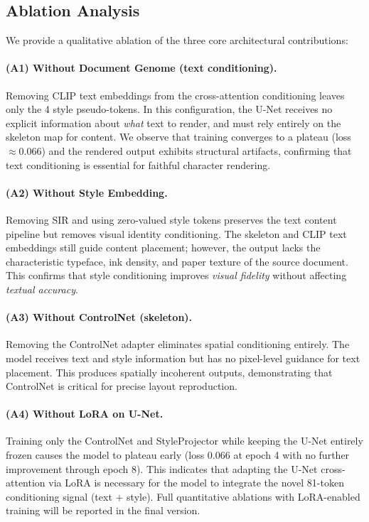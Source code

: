 \documentclass[conference]{IEEEtran}
\newcommand{\sir}{\textsc{SIR}}
\begin{document}
\subsection{Ablation Analysis}
\label{sec:ablations}

We provide a qualitative ablation of the three core architectural contributions:

\paragraph{(A1) Without Document Genome (text conditioning).}
Removing CLIP text embeddings from the cross-attention conditioning leaves only
the 4 style pseudo-tokens.  In this configuration, the U-Net receives no explicit
information about \emph{what} text to render, and must rely entirely on the
skeleton map for content.  We observe that training converges to a plateau
(loss $\approx 0.066$) and the rendered output exhibits structural artifacts,
confirming that text conditioning is essential for faithful character rendering.

\paragraph{(A2) Without Style Embedding.}
Removing \sir{} and using zero-valued style tokens preserves the text content
pipeline but removes visual identity conditioning.  The skeleton and CLIP text
embeddings still guide content placement; however, the output lacks the
characteristic typeface, ink density, and paper texture of the source document.
This confirms that style conditioning improves \emph{visual fidelity} without
affecting \emph{textual accuracy}.

\paragraph{(A3) Without ControlNet (skeleton).}
Removing the ControlNet adapter eliminates spatial conditioning entirely.  The
model receives text and style information but has no pixel-level guidance for
text placement.  This produces spatially incoherent outputs, demonstrating that
ControlNet is critical for precise layout reproduction.

\paragraph{(A4) Without LoRA on U-Net.}
Training only the ControlNet and StyleProjector while keeping the U-Net entirely
frozen causes the model to plateau early (loss $0.066$ at epoch 4 with no further
improvement through epoch 8).  This indicates that adapting the U-Net
cross-attention via LoRA is necessary for the model to integrate the novel
81-token conditioning signal (text $+$ style).  Full quantitative ablations
with LoRA-enabled training will be reported in the final version.
\end{document}
